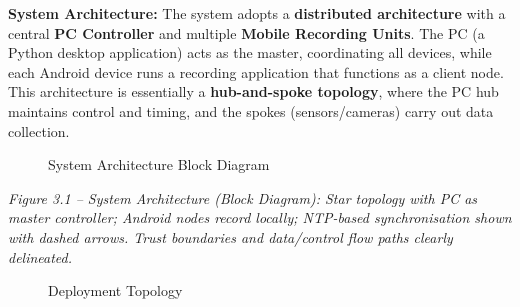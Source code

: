\documentclass[12pt,a4paper]{article}
\begin{document}
\textbf{System Architecture:} The system adopts a \textbf{distributed architecture} with a central \textbf{PC Controller} and multiple \textbf{Mobile Recording Units}. The PC (a Python desktop application) acts as the master, coordinating all devices, while each Android device runs a recording application that functions as a client node. This architecture is essentially a \textbf{hub-and-spoke topology}, where the PC hub maintains control and timing, and the spokes (sensors/cameras) carry out data collection.

\begin{figure}
\centering
{}
\caption{System Architecture Block Diagram}
\end{figure}

\emph{Figure 3.1 -- System Architecture (Block Diagram): Star topology with PC as master controller; Android nodes record locally; NTP-based synchronisation shown with dashed arrows. Trust boundaries and data/control flow paths clearly delineated.}

\begin{figure}
\centering
{}
\caption{Deployment Topology}
\end{figure}
\end{document}
